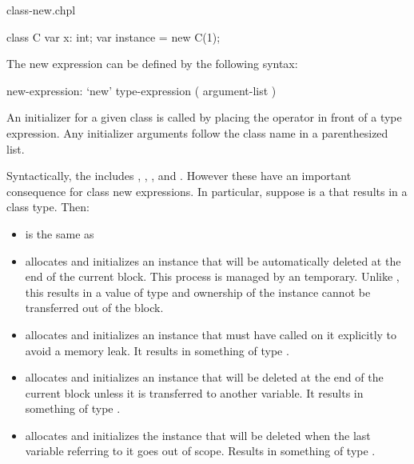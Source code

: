 \begin{chapelexample}{class-new.chpl}
\begin{chapel}
class C {
  var x: int;
}
var instance = new C(1);
\end{chapel}
\end{chapelexample}

The new expression can be defined by the following syntax:

\begin{syntax}
new-expression:
  `new' type-expression ( argument-list )
\end{syntax}

An initializer for a given class is called by placing the 
operator in front of a type expression. Any initializer arguments follow
the class name in a parenthesized list.

Syntactically, the  includes ,
, , and . However these have an
important consequence for class new expressions. In particular, suppose
 is a  that results in a class type. Then:

\begin{itemize}

  \item {} is the same as 

  \item {} allocates and initializes an instance
    that will be automatically deleted at the end of the current block.
    This process is managed by an  temporary.  Unlike
    , this results in a value of type  and ownership of the instance cannot be transferred out of the
    block.

  \item {} allocates and initializes an instance
    that must have  called on it explicitly to avoid a
    memory leak. It results in something of type .

  \item {} allocates and initializes an instance that
    will be deleted at the end of the current block unless it is
    transferred to another  variable. It results in something
    of type .

  \item {} allocates and initializes the instance that
    will be deleted when the last  variable referring to it
    goes out of scope. Results in something of type .

\end{itemize}

